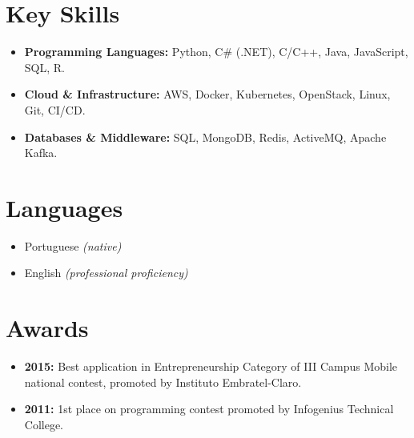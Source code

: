 \documentclass[11pt,a4paper,sans]{moderncv}        %
\begin{document}
\section{Key Skills}

\vspace{6pt}

\begin{itemize}

\item \textbf{Programming Languages:} Python, C\# (.NET), C/C++, Java, JavaScript, SQL, R.

\vspace{6pt}

\item \textbf{Cloud \& Infrastructure:} AWS, Docker, Kubernetes, OpenStack, Linux, Git, CI/CD.

\vspace{6pt}

\item \textbf{Databases \& Middleware:} SQL, MongoDB, Redis, ActiveMQ, Apache Kafka.

\end{itemize}

\section{Languages}

\vspace{6pt}

\begin{itemize}

\item{Portuguese \textit{(native)}}
\item{English \textit{(professional proficiency)}}

\end{itemize}

\section{Awards}

\vspace{6pt}
 
\begin{itemize}

\item{\textbf{2015:} Best application in Entrepreneurship Category of III Campus Mobile national contest, promoted by Instituto Embratel-Claro.}

\item{\textbf{2011:} 1st place on programming contest promoted by Infogenius Technical College.}

\end{itemize}
\end{document}
